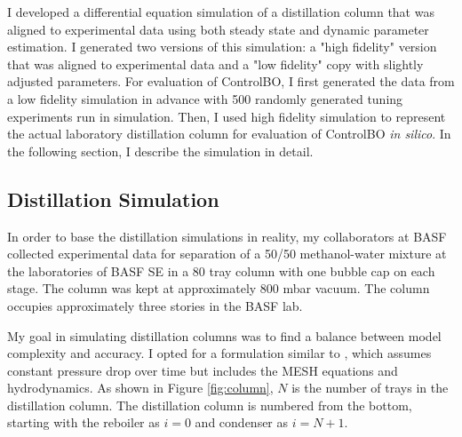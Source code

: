 I developed a differential equation simulation of a distillation column that was aligned to experimental data using both steady state and dynamic parameter estimation. I generated two versions of this simulation: a "high fidelity" version that was aligned to experimental data and a "low fidelity" copy with slightly adjusted parameters. For evaluation of ControlBO, I first generated the data from a low fidelity simulation in advance with 500 randomly generated tuning experiments run in simulation. Then, I used high fidelity simulation to represent the actual laboratory distillation column for evaluation of ControlBO \textit{in silico}. In the following section, I describe the simulation in detail.

\subsection{Distillation Simulation}\label{sec:distillation_model}

In order to base the distillation simulations in reality, my collaborators at BASF collected experimental data for separation of a 50/50 methanol-water mixture at the laboratories of BASF SE in a 80 tray column with one bubble cap on each stage. The column was kept at approximately 800 mbar vacuum. The column occupies approximately three stories in the BASF lab.  


My goal in simulating distillation columns was to find a balance between model complexity and accuracy. I opted for a formulation similar to \citet{Diehl2001}, which assumes constant pressure drop over time but includes the MESH equations and hydrodynamics. As shown in Figure \ref{fig:column}, $N$ is the number of trays in the distillation column. The distillation column is numbered from the bottom, starting with the reboiler as $i=0$ and condenser as $i=N+1$.  

